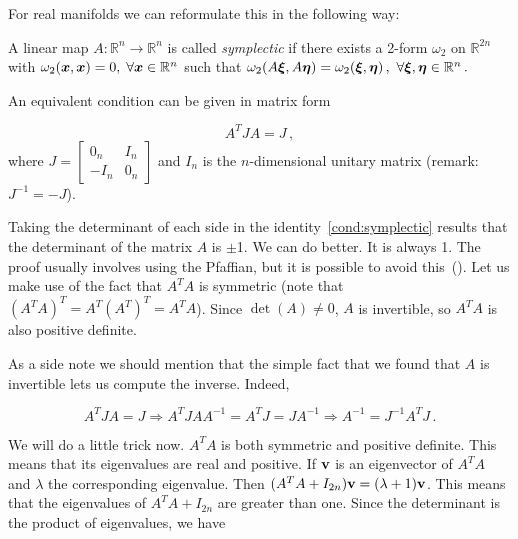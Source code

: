 \documentclass[12pt, class=report, crop=false]{standalone}
\begin{document}
For real manifolds we can reformulate this in the following way:

\begin{definition*}
  A linear map \(A: \mathbb{R}^{n} \to \mathbb{R}^{n}\) is called
  \emph{symplectic} if there exists a 2-form \(\omega_2\) on \(\mathbb{R}^{2n}\) with \(\omega_2 (\vb*{x},\vb*{x}) = 0,\;\forall \vb*{x} \in \mathbb{R}^{n}\)
  such that
  \(
  \omega_2 (A\vb*{\xi}, A\vb*{\eta}) = \omega_2 (\vb*{\xi},\vb*{\eta})\,,\
  \forall \vb*{\xi}, \vb*{\eta} \in \mathbb{R}^{n}\,.
  \)
\end{definition*}

An equivalent condition can be given in matrix form

\begin{equation}
\label{cond:symplectic}
  A^T J A = J\,,
\end{equation}
where \(J = \begin{bmatrix}
  0_n & I_n \\
  -I_n & 0_n
\end{bmatrix}\) and \(I_n\) is the \(n\)-dimensional unitary matrix (remark: \(J^{-1} = -J\)).


Taking the determinant of each side in the identity~\ref{cond:symplectic} results that the determinant of the matrix \(A\) is \(\pm\)1. We can do better. It is always 1. The proof usually involves using the Pfaffian, but it is possible to avoid this~(\cite{rimElementaryProofThat2018}). Let us make use of the fact that \(A^T A\) is symmetric (note that \((A^T A)^T = A^T (A^T)^T = A^T A\)). Since \(\det(A) \neq 0\), \(A\) is invertible, so \(A^T A\) is also positive definite.

As a side note we should mention that the simple fact that we found that \(A\) is invertible lets us compute the inverse. Indeed,

\begin{equation}
\label{inv-sympl-matix}
  A^T J A = J \Rightarrow A^T J A A^{-1} = A^T J = J A^{-1} \Rightarrow A^{-1} = J^{-1} A^T J\,.
\end{equation}

We will do a little trick now. \(A^T A\) is both symmetric and positive definite. This means that its eigenvalues are real and positive. If \(\vb{v}\) is an eigenvector of \(A^T A\) and \(\lambda\) the corresponding eigenvalue. Then \((A^T A + I_{2n}) \vb{v} = (\lambda + 1)\vb{v}\). This means that the eigenvalues of \(A^T A + I_{2n}\) are greater than one. Since the determinant is the product of eigenvalues, we have
\end{document}
